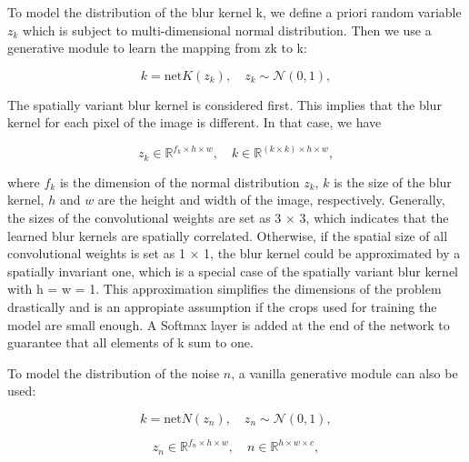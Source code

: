             To model the distribution of the blur kernel k, we define a priori random variable $z_k$ which is subject to multi-dimensional normal distribution. 
            Then we use a generative module to learn the mapping from zk to k: 

            \begin{equation}
                k = \text{net}K(z_k), \quad z_k \sim \mathcal{N}(0,1),
            \end{equation}

            The spatially variant blur kernel is considered first. This implies that the blur kernel for each pixel of the image is different. In that case, we have

            \begin{equation}
                z_k \in \mathbb{R}^{f_k \times h \times w}, \quad k \in \mathbb{R}^{(k \times k) \times h \times w},
            \end{equation}

            where $f_k$ is the dimension of the normal distribution $z_k$, $k$ is the size of the blur kernel, $h$ and $w$ are the height and width of the image, respectively.
            Generally, the sizes of the convolutional weights  are set as 3 × 3, which indicates that the learned blur kernels are spatially correlated.
            Otherwise, if the spatial size of all convolutional weights is set as 1 × 1, the blur kernel could be approximated by a spatially invariant one, which is a special case of the spatially variant blur kernel with h = w = 1.
            This approximation simplifies the dimensions of the problem drastically and is an appropiate assumption if the crops used for training the model are small enough.
            A Softmax layer is added at the end of the network to guarantee that all elements of k sum to one.
            
            
            To model the distribution of the noise $n$, a vanilla generative module can also be used:

            \begin{equation}
                k = \text{net}N(z_n), \quad z_n \sim \mathcal{N}(0,1),
            \end{equation}

            \begin{equation}
                z_n \in \mathbb{R}^{f_n \times h \times w}, \quad n \in \mathbb{R}^{h \times w \times c},
            \end{equation}

